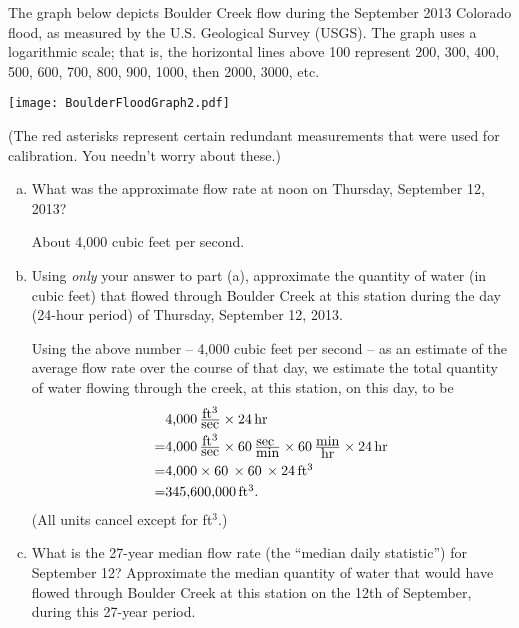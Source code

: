 \documentclass[12pt]{article}
\def\Red{\color{red}}
\def\Black{\color{black}}
\def\Red{\color{white}}
\def\Black{\color{black}}
\begin{document}
The graph below depicts Boulder Creek flow during the September 2013 Colorado flood, as measured by the U.S. Geological Survey (USGS). The graph uses a logarithmic scale; that is, the horizontal lines above 100 represent 200, 300, 400, 500, 600, 700, 800, 900, 1000, then 2000, 3000, etc.

\begin{center}
\texttt{[image: BoulderFloodGraph2.pdf]}
\end{center}

(The red asterisks represent certain redundant measurements that were used for calibration.  You needn't worry about these.)

\begin{enumerate}[(a)]

\item What was the approximate flow rate at noon on Thursday, September 12, 2013?

\Red About 4,000 cubic feet per second.\Black
\vfill\eject

\item Using {\it only} your answer to part (a), approximate the quantity of water (in cubic feet) that flowed through Boulder Creek at this station during the day (24-hour period) of Thursday, September 12, 2013.

\Red
Using the above number -- 4,000 cubic feet per second -- as an estimate of the average flow rate over the course of that day, we estimate the total quantity of water flowing through the creek, at this station, on this day, to be
\begin{align*}& \hbox{4,000}\, {\textstyle \frac{\hbox{ft$^3$}}{\hbox{sec}}}\times  24\,  \hbox{hr} \\=& \hbox{4,000}\,  {\textstyle\frac{\hbox{ft$^3$}}{\hbox{sec}}}\times 60\,  {\textstyle\frac{\hbox{sec }}{\hbox{min}}}\times 60\,  {\textstyle\frac{\hbox{min}}{\hbox{hr}}}\times  24\,  \hbox{hr}\\=& \hbox{4,000}\times 60\,   \times 60\, \times  24 \, \hbox{ft$^3$} 
\\=& \hbox{345,600,000}\, \hbox{ft$^3$.} \end{align*}(All units cancel except for \hbox{ft$^3$}.)\Black
\vfill

\item  What is the 27-year median flow rate (the ``median daily statistic'') for September 12? Approximate the median quantity of water that would have flowed through Boulder Creek at this station on the 12th of September, during this 27-year period.


\end{enumerate}
\end{document}
